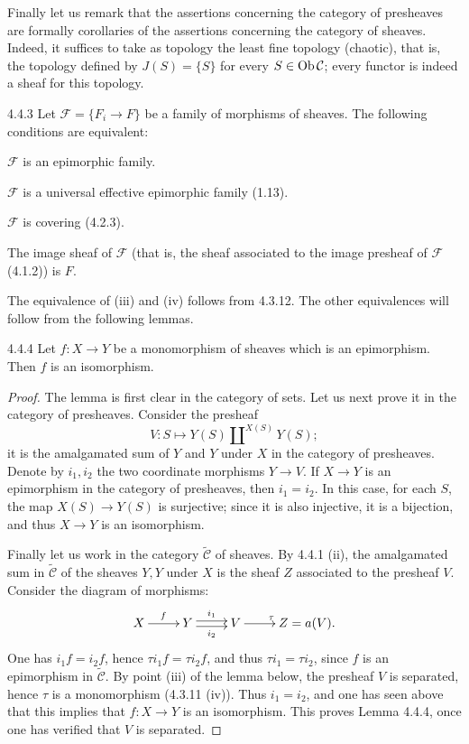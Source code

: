 Finally let us remark that the assertions concerning the category
of presheaves are formally corollaries of the assertions concerning
the category of sheaves. Indeed, it suffices to take as topology
the least fine topology (\og chaotic\fg), that is, the topology
defined by \(J(S)=\{S\}\) for every \(S\in\operatorname{Ob}\mathcal C\);
every functor is indeed a sheaf for this topology.

\begin{proposition}{4.4.3}\label{IV.4.4.3}
Let \(\mathcal F=\{F_i\to F\}\) be a family of morphisms of sheaves.
The following conditions are equivalent:
\begin{enumeratei}
\item \(\mathcal F\) is an epimorphic family.
\item \(\mathcal F\) is a universal effective epimorphic family (1.13).
\item \(\mathcal F\) is covering (4.2.3).
\item The image sheaf of \(\mathcal F\) (that is, the sheaf associated
to the image presheaf of \(\mathcal F\) (4.1.2)) is \(F\).
\end{enumeratei}
\end{proposition}
The equivalence of (iii) and (iv) follows from 4.3.12.
The other equivalences will follow from the following lemmas.

\begin{lemma}{4.4.4}\label{IV.4.4.4}
Let \(f:X\to Y\) be a monomorphism of sheaves which is an
epimorphism. Then \(f\) is an isomorphism.
\end{lemma}
\begin{proof}
The lemma is first clear in the category of sets.
Let us next prove it in the category of presheaves.
Consider the presheaf
\[
V:S\longmapsto Y(S)\amalg^{X(S)}Y(S);
\]
it is the amalgamated sum of \(Y\) and \(Y\) under \(X\) in the
category of presheaves. Denote by \(i_1,i_2\) the two
\og coordinate\fg{} morphisms \(Y\to V\).
If \(X\to Y\) is an epimorphism in the category of presheaves,
then \(i_1=i_2\). In this case, for each \(S\), the map
\(X(S)\to Y(S)\) is surjective; since it is also injective,
it is a bijection, and thus \(X\to Y\) is an isomorphism.

Finally let us work in the category \(\widetilde{\mathcal C}\)
of sheaves. By 4.4.1 (ii), the amalgamated sum in
\(\widetilde{\mathcal C}\) of the sheaves \(Y,Y\) under \(X\)
is the sheaf \(Z\) associated to the presheaf \(V\).
Consider the diagram of morphisms:
\[
\xymatrix{
X\ar[r]^f & Y\ar@<.5ex>[r]^{i_1}\ar@<-.5ex>[r]_{i_2}
 & V\ar[r]^\tau & Z=a(V). }
\]
One has \(i_1f=i_2f\), hence \(\tau i_1f=\tau i_2f\), and thus
\(\tau i_1=\tau i_2\), since \(f\) is an epimorphism in
\(\widetilde{\mathcal C}\). By point (iii) of the lemma below,
the presheaf \(V\) is separated, hence \(\tau\) is a monomorphism
(4.3.11 (iv)). Thus \(i_1=i_2\), and one has seen above that
this implies that \(f:X\to Y\) is an isomorphism.
This proves Lemma 4.4.4, once one has verified that \(V\) is separated.
\end{proof}
